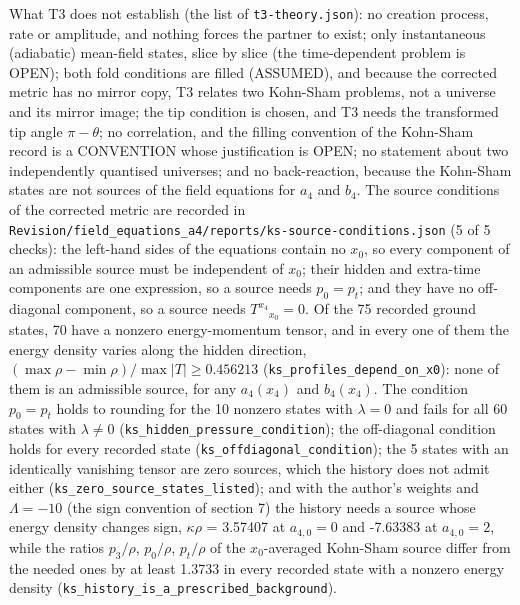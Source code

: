 \documentclass[11pt]{article}
\begin{document}
What T3 does not establish (the list of \texttt{t3-theor\allowbreak{}y.json}): no creation process, rate or amplitude, and nothing forces the partner to exist; only instantaneous (adiabatic) mean-field states, slice by slice (the time-dependent problem is OPEN); both fold conditions are filled (ASSUMED), and because the corrected metric has no mirror copy, T3 relates two Kohn-Sham problems, not a universe and its mirror image; the tip condition is chosen, and T3 needs the transformed tip angle $\pi - \theta$; no correlation, and the filling convention of the Kohn-Sham record is a CONVENTION whose justification is OPEN; no statement about two independently quantised universes; and no back-reaction, because the Kohn-Sham states are not sources of the field equations for $a_4$ and $b_4$. The source conditions of the corrected metric are recorded in \texttt{Revision\allowbreak{}/field\_e\allowbreak{}quations\allowbreak{}\_a4/repo\allowbreak{}rts/ks-s\allowbreak{}ource-co\allowbreak{}nditions\allowbreak{}.json} (5 of 5 checks): the left-hand sides of the equations contain no $x_0$, so every component of an admissible source must be independent of $x_0$; their hidden and extra-time components are one expression, so a source needs $p_0 = p_t$; and they have no off-diagonal component, so a source needs $T^{x_4}{}_{x_0} = 0$. Of the 75 recorded ground states, 70 have a nonzero energy-momentum tensor, and in every one of them the energy density varies along the hidden direction, $(\max\rho - \min\rho)/\max|T| \geq 0.456213$ (\texttt{ks\_profi\allowbreak{}les\_depe\allowbreak{}nd\_on\_x0}): none of them is an admissible source, for any $a_4(x_4)$ and $b_4(x_4)$. The condition $p_0 = p_t$ holds to rounding for the 10 nonzero states with $\lambda = 0$ and fails for all 60 states with $\lambda \neq 0$ (\texttt{ks\_hidde\allowbreak{}n\_pressu\allowbreak{}re\_condi\allowbreak{}tion}); the off-diagonal condition holds for every recorded state (\texttt{ks\_offdi\allowbreak{}agonal\_c\allowbreak{}ondition}); the 5 states with an identically vanishing tensor are zero sources, which the history does not admit either (\texttt{ks\_zero\_\allowbreak{}source\_s\allowbreak{}tates\_li\allowbreak{}sted}); and with the author's weights and $\Lambda = -10$ (the sign convention of section 7) the history needs a source whose energy density changes sign, $\kappa\rho$ = 3.57407 at $a_{4,0} = 0$ and -7.63383 at $a_{4,0} = 2$, while the ratios $p_3/\rho$, $p_0/\rho$, $p_t/\rho$ of the $x_0$-averaged Kohn-Sham source differ from the needed ones by at least 1.3733 in every recorded state with a nonzero energy density (\texttt{ks\_histo\allowbreak{}ry\_is\_a\_\allowbreak{}prescrib\allowbreak{}ed\_backg\allowbreak{}round}).
\end{document}
